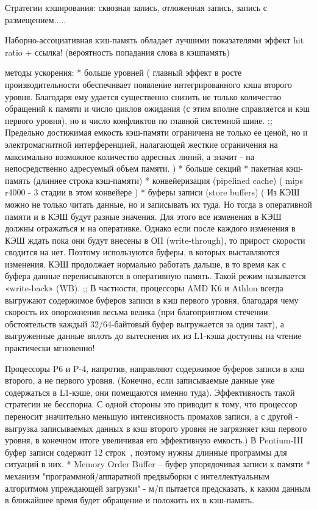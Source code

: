 \documentclass[14pt]{extreport}
\begin{document}
Стратегии кэширования: сквозная запись, отложенная запись, запись с размещением.....

Наборно-ассоциативная кэш-память обладает лучшими показателями эффект hit ratio + ссылка! (вероятность попадания слова в кэшпамять)

методы ускорения:
* больше уровней ( главный эффект в росте производительности обеспечивает появление интегрированного кэша второго уровня. Благодаря ему удается существенно снизить не только количество обращений к памяти и число циклов ожидания (с этим вполне справляется и кэш первого уровня), но и число конфликтов по главной системной шине. ;; Предельно достижимая емкость кэш-памяти ограничена не только ее ценой, но и электромагнитной интерференцией, налагающей жесткие ограничения на максимально возможное количество адресных линий, а значит - на непосредственно адресуемый объем памяти.  )
* больше секций
* пакетная кэш-память (длиннее строка кэш-памяти)
* конвейеризация (pipelined cache) ( mips r4000 - 3 стадии в этом конвейере )
* буферы записи (store buffers) ( Из КЭШ можно не только читать данные, но и записывать их туда. Но тогда в оперативной памяти и в КЭШ будут разные значения. Для этого все изменения в КЭШ должны отражаться и на оперативке. Однако если после каждого изменения в КЭШ ждать пока они будут внесены в ОП (write-through), то прирост скорости сводится на нет. Поэтому используются буферы, в которых выставляются изменения. КЭШ продолжает нормально работать дальше, в то время как с буфера данные переписываются в оперативную память. Такой режим называется «write-back» (WB). ;;
В частности, процессоры AMD K6 и Athlon всегда выгружают содержимое буферов записи в кэш первого уровня, благодаря чему скорость их опорожнения весьма велика (при благоприятном стечении обстоятельств каждый 32/64-байтовый буфер выгружается за один такт), а выгруженные данные вплоть до вытеснения их из L1-кэша доступны на чтение практически мгновенно!

Процессоры P6 и P-4, напротив, направляют содержимое буферов записи в кэш второго, а не первого уровня. (Конечно, если записываемые данные уже содержаться в L1-кэше, они помещаются именно туда). Эффективность такой стратегии не бесспорна. С одной стороны это приводит к тому, что процессор переносит значительно меньшую интенсивность промахов записи, а с другой - выгрузка записываемых данных в кэш второго уровня не загрязняет кэш первого уровня, в конечном итоге увеличивая его эффективную емкость.)
В Pentium-III буфер записи содержит 12 строк~\cite{Kris}, поэтому нужны длинные программы для ситуаций в них.
* Memory Order Buffer – буфер упорядочивая записи к памяти
* механизм "программной/аппаратной предвыборки с интеллектуальным алгоритмом упреждающей загрузки" - м/п пытается предсказать, к каким данным в ближайшее время будет обращение и положить их в кэш-память.
\end{document}
